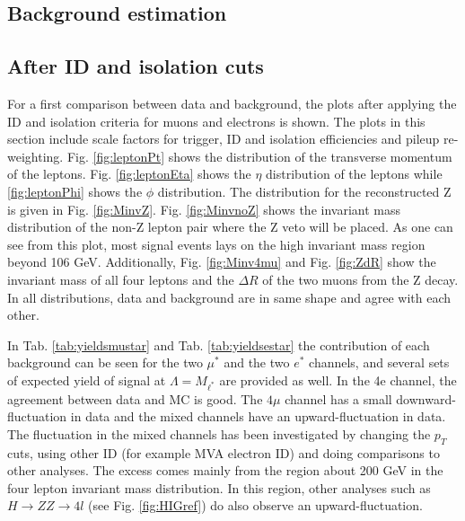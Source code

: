 \clearpage

\subsection{Background estimation}
\subsection*{After ID and isolation cuts}

For a first comparison between data and background, the plots after applying the ID and isolation criteria for muons and electrons is shown. The plots in this section 
include scale factors for trigger, ID and isolation efficiencies and pileup re-weighting. Fig. \ref{fig:leptonPt} shows the distribution of the transverse momentum of the 
leptons. Fig. \ref{fig:leptonEta} shows the $\eta$ distribution of the leptons while \ref{fig:leptonPhi} shows the $\phi$ distribution. The distribution for the 
reconstructed Z is given in Fig. \ref{fig:MinvZ}. Fig. \ref{fig:MinvnoZ} shows the invariant mass distribution of the non-Z lepton pair where the Z veto will be placed. As one can see from this plot, most signal events lays on the high invariant mass region beyond 106 GeV. 
Additionally, Fig. \ref{fig:Minv4mu} and Fig. \ref{fig:ZdR} show the invariant mass of all four leptons and the $\Delta R$ of the two muons from the Z decay. In all 
distributions, data and background are in same shape and agree with each other. 

In Tab. \ref{tab:yieldsmustar} and Tab. \ref{tab:yieldsestar} the contribution of each background can be seen for the two $\mu^{*}$ and the two $e^{*}$ channels, and several sets of expected yield of signal at $\Lambda = M_{\ell^{*}}$ are provided as well. In the 4e channel, the agreement between data and MC is good. The $4\mu$ channel has a small 
downward-fluctuation in data and the mixed channels have an upward-fluctuation in data. The fluctuation in the mixed channels has been investigated by changing the $p_{T}$  
cuts, using other ID (for example MVA electron ID) and doing comparisons to other analyses. The excess comes mainly from the region about 200 GeV in the four lepton invariant mass 
distribution. In this region, other analyses such as $H\rightarrow ZZ\rightarrow 4l$ (see Fig. \ref{fig:HIGref})\cite{HIGxcess} do also observe an upward-fluctuation.          

